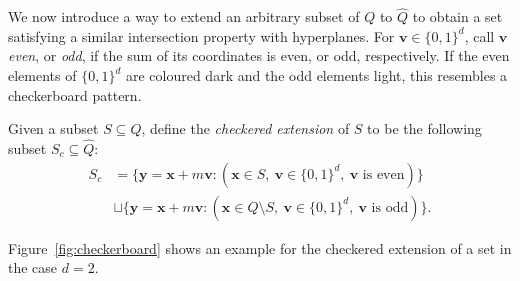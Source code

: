 \documentclass[10pt,a4paper]{article}
\numberwithin{equation}{section}
\begin{document}
We now introduce a way to extend an arbitrary subset of $Q$ to $\widehat{Q}$ to obtain a set satisfying a similar intersection property with hyperplanes. For $\mathbf{v}\in \{0,1\}^d$, call $\mathbf{v}$ \textit{even}, or \textit{odd}, if the sum of its coordinates is even, or odd, respectively. If the even elements of $\{0,1\}^d$ are coloured dark and the odd elements light, this resembles a checkerboard pattern.

\begin{definition}\label{def:checkering}
Given a subset $S\subseteq Q$, define the \textit{checkered extension} of $S$ to be the following subset $S_c\subseteq \widehat{Q}$:
\begin{equation*}
\begin{split}
S_c &=\{\mathbf{y}=\mathbf{x}+m\mathbf{v}: (\mathbf{x}\in S, ~\mathbf{v}\in \{0,1\}^d, ~\mathbf{v}\text{ is even})\} \\
&\sqcup \{\mathbf{y}=\mathbf{x}+m\mathbf{v}: (\mathbf{x}\in Q\setminus S, ~\mathbf{v}\in \{0,1\}^d, ~\mathbf{v}\text{ is odd})\}.
\end{split}
\end{equation*}
\end{definition}

Figure~\ref{fig:checkerboard} shows an example for the checkered extension of a set in the case $d=2$.
\end{document}
